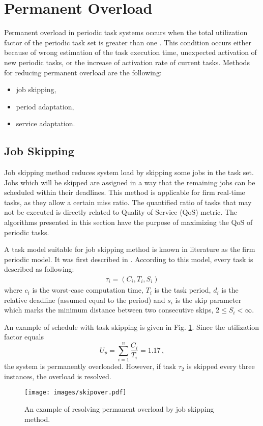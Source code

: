 \section{Permanent Overload}

Permanent overload in periodic task systems occurs when the total utilization factor of the periodic task set is greater than one \cite{buttazzo2011hard}. 
This condition occurs either because of wrong estimation of the task execution time, unexpected activation of new periodic tasks, or the increase of activation rate of current tasks.
Methods for reducing permanent overload are the following:
\begin{itemize}
	\item{job skipping,}
	\item{period adaptation,}
	\item{service adaptation.}
\end{itemize}

\subsection{Job Skipping}
\label{skip_algs}
Job skipping method reduces system load by skipping some jobs in the task set. Jobs which will be skipped are assigned in a way that the remaining jobs can be scheduled within their deadlines.
This method is applicable for firm real-time tasks, as they allow a certain miss ratio. 
The quantified ratio of tasks that may not be executed is directly related to Quality of Service 
(QoS) metric. 
The algorithms presented in this section have the purpose of maximizing the QoS of periodic tasks.

A task model suitable for job skipping method is known in literature as the firm periodic model.
It was first described in \cite{koren1995skip}.
According to this model, every task is described as following:
\begin{align*}
\tau_i = (C_i, T_i, S_i)
\end{align*}
where $c_i$ is the worst-case computation time, $T_i$ is the task period, $d_i$ is the relative deadline (assumed equal to the period) and $s_i$ is the skip parameter which marks the minimum distance between two consecutive skips, \(2 \leq S_i < \infty\).

An example of schedule with task skipping is given in Fig. \ref{skipover}. 
Since the utilization factor equals 
\begin{equation*}
U_p = \sum_{i=1}^{n} \frac{C_i}{T_i} = 1.17 \, ,
\end{equation*}
the system is permanently overloaded. 
However, if task \(\tau_2\) is skipped every three instances, the overload is resolved.
\\
\begin{figure}[ht]
    \centering
    \texttt{[image: images/skipover.pdf]}
    \caption{An example of resolving permanent overload by job skipping method.}
    \label{skipover}
\end{figure}


